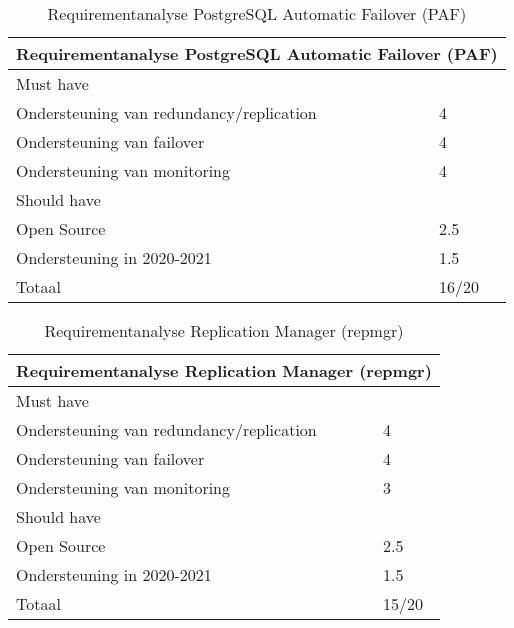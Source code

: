 \begin{table}[!h]
    \centering
    \begin{tabular}{ |p{6cm}||p{6cm}|  }
        \hline
        \multicolumn{2}{|c|}{Requirementanalyse PostgreSQL Automatic Failover (PAF)} \\
        \hline
        Must have & \\
        \hline
        Ondersteuning van redundancy/replication  & 4 \\
        Ondersteuning van failover &  4 \\
        Ondersteuning van monitoring & 4 \\
        \hline
        Should have & \\
        \hline
        Open Source &  2.5 \\
        Ondersteuning in 2020-2021 & 1.5 \\
        \hline
        \hline
        Totaal & 16/20 \\
        \hline    
    \end{tabular}
    \caption{Requirementanalyse PostgreSQL Automatic Failover (PAF)}
    \label{table:Requirementanalyse PostgreSQL Automatic Failover (PAF)}
\end{table}


\begin{table}[!h]
    \centering
    \begin{tabular}{ |p{6cm}||p{6cm}|  }
        \hline
        \multicolumn{2}{|c|}{Requirementanalyse Replication Manager (repmgr)} \\
        \hline
        Must have & \\
        \hline
        Ondersteuning van redundancy/replication  & 4 \\
        Ondersteuning van failover &  4 \\
        Ondersteuning van monitoring & 3 \\
        \hline
        Should have & \\
        \hline
        Open Source &  2.5 \\
        Ondersteuning in 2020-2021 & 1.5 \\
        \hline
        \hline
        Totaal & 15/20 \\
        \hline
    \end{tabular}
    \caption{Requirementanalyse Replication Manager (repmgr)}
    \label{table:Requirementanalyse Replication Manager (repmgr)}
\end{table}



